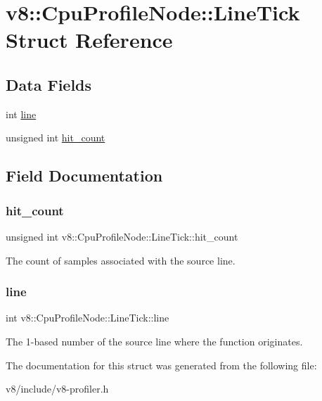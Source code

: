 \hypertarget{structv8_1_1CpuProfileNode_1_1LineTick}{}\section{v8\+:\+:Cpu\+Profile\+Node\+:\+:Line\+Tick Struct Reference}
\label{structv8_1_1CpuProfileNode_1_1LineTick}
\subsection*{Data Fields}
\begin{DoxyCompactItemize}
\item 
int \mbox{\hyperlink{structv8_1_1CpuProfileNode_1_1LineTick_af96fbdefbc07b2c84cf41d74555626f6}{line}}
\item 
unsigned int \mbox{\hyperlink{structv8_1_1CpuProfileNode_1_1LineTick_a62653fb1e6d381a5747d24b83aab1c1b}{hit\+\_\+count}}
\end{DoxyCompactItemize}


\subsection{Field Documentation}
\mbox{\label{structv8_1_1CpuProfileNode_1_1LineTick_a62653fb1e6d381a5747d24b83aab1c1b}} 
\subsubsection{\texorpdfstring{hit\+\_\+count}{hit\_count}}
{\footnotesize\ttfamily unsigned int v8\+::\+Cpu\+Profile\+Node\+::\+Line\+Tick\+::hit\+\_\+count}

The count of samples associated with the source line. \mbox{\label{structv8_1_1CpuProfileNode_1_1LineTick_af96fbdefbc07b2c84cf41d74555626f6}} 
\subsubsection{\texorpdfstring{line}{line}}
{\footnotesize\ttfamily int v8\+::\+Cpu\+Profile\+Node\+::\+Line\+Tick\+::line}

The 1-\/based number of the source line where the function originates. 

The documentation for this struct was generated from the following file\+:\begin{DoxyCompactItemize}
\item 
v8/include/v8-\/profiler.\+h\end{DoxyCompactItemize}
